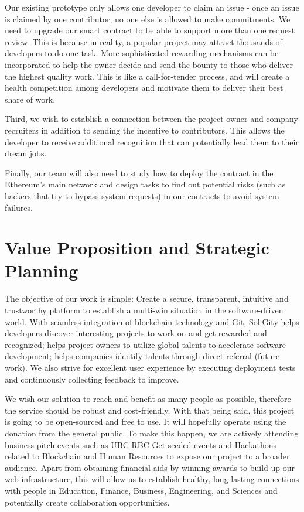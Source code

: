 \documentclass[12pt]{article}
\renewcommand{\_}{\kern-1.5pt\textunderscore\kern-1.5pt}
\begin{document}
Our existing prototype only allows one developer to claim an issue - once an issue is claimed by one contributor, no one else is allowed to make commitments. We need to upgrade our smart contract to be able to support more than one request review. This is because in reality, a popular project may attract thousands of developers to do one task. More sophisticated rewarding mechanisms can be incorporated to help the owner decide and send the bounty to those who deliver the highest quality work. This is like a call-for-tender process, and will create a health competition among developers and motivate them to deliver their best share of work.

Third, we wish to establish a connection between the project owner and company recruiters in addition to sending the incentive to contributors. This allows the developer to receive additional recognition that can potentially lead them to their dream jobs.  

Finally, our team will also need to study how to deploy the contract in the Ethereum’s main network and design tasks to find out potential risks (such as hackers that try to bypass system requests) in our contracts to avoid system failures.

\section{Value Proposition and Strategic Planning}
The objective of our work is simple: Create a secure, transparent, intuitive and trustworthy platform to establish a multi-win situation in the software-driven world. With seamless integration of blockchain technology and Git, SoliGity helps developers discover interesting projects to work on and get rewarded and recognized; helps project owners to utilize global talents to accelerate software development; helps companies identify talents through direct referral (future work). We also strive for excellent user experience by executing deployment tests and continuously collecting feedback to improve. 

We wish our solution to reach and benefit as many people as possible, therefore the service should be robust and cost-friendly. With that being said, this project is going to be open-sourced and free to use. It will hopefully operate using the donation from the general public. To make this happen, we are actively attending business pitch events such as UBC-RBC Get-seeded events and Hackathons related to Blockchain and Human Resources to expose our project to a broader audience. Apart from obtaining financial aids by winning awards to build up our web infrastructure, this will allow us to establish healthy, long-lasting connections with people in Education, Finance, Business, Engineering, and Sciences and potentially create collaboration opportunities.
\end{document}
